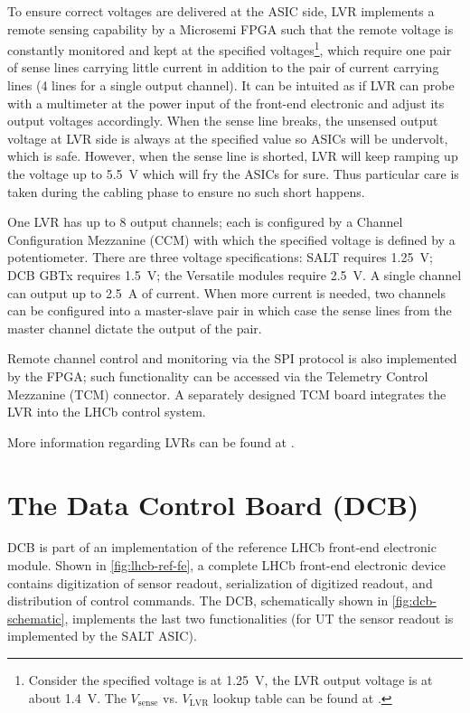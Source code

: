To ensure correct voltages are delivered at the ASIC side,
LVR implements a remote sensing capability by a Microsemi FPGA such that the
remote voltage is constantly monitored and kept at the specified
voltages\footnote{
    Consider the specified voltage is at 1.25~V, the LVR output voltage is
    at about 1.4~V.
    The $V_\text{sense}$ vs. $V_\text{LVR}$ lookup table can be found at
    \cite{LVR_output_voltage_lookup}.
}, which require one pair of sense lines carrying little current in addition to
the pair of current
carrying lines (4 lines for a single output channel).
It can be intuited as if LVR can probe with a multimeter at the power input of
the front-end electronic and adjust its output voltages accordingly.
When the sense line breaks, the unsensed output voltage at LVR side is always
at the specified value so ASICs will be undervolt, which is safe.
However, when the sense line is shorted, LVR will keep ramping up the voltage
up to 5.5~V which will fry the ASICs for sure.
Thus particular care is taken during the cabling phase to ensure no such short
happens.

One LVR has up to 8 output channels; each is configured by a Channel
Configuration Mezzanine (CCM) with which the specified voltage is defined by a
potentiometer.
There are three voltage specifications: SALT requires 1.25~V; DCB GBTx requires
1.5~V; the Versatile modules require 2.5~V.
A single channel can output up to 2.5~A of current.
When more current is needed, two channels can be configured into a master-slave
pair in which case the sense lines from the master channel dictate the output
of the pair.

Remote channel control and monitoring via the SPI protocol is also implemented
by the FPGA;
such functionality can be accessed via the Telemetry Control Mezzanine (TCM)
connector.
A separately designed TCM board integrates the LVR into the LHCb control system.

More information regarding LVRs can be found at \cite{LVR_manual}.


\section{The Data Control Board (DCB)}
\label{ref:ut:dcb}

DCB is part of an implementation of the reference LHCb front-end  electronic
module.
Shown in \cref{fig:lhcb-ref-fe},
a complete LHCb front-end electronic device contains digitization of sensor
readout, serialization of digitized readout, and distribution of control
commands.
The DCB,
schematically shown in \cref{fig:dcb-schematic},
implements the last two functionalities (for UT the sensor readout is implemented
by the SALT ASIC).

